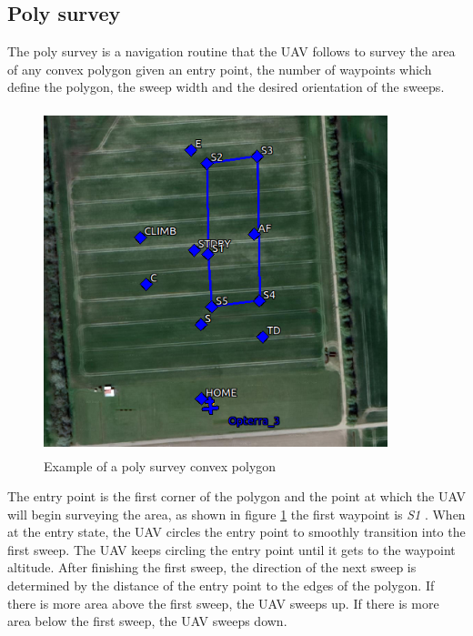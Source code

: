 \subsection{Poly survey}
The poly survey is a navigation routine that the UAV follows to survey the area of any convex polygon given an entry point, the number of waypoints which define the polygon, the sweep width and the desired orientation of the sweeps.
\begin{figure}[H]
\centering
\includegraphics[width=10cm,height=10cm,keepaspectratio]{imagenes/Convex_polygon.png}
\caption{Example of a poly survey convex polygon}
\label{fig:Convex_poly}
\end{figure}
The entry point is the first corner of the polygon and the point at which the UAV will begin surveying the area, as shown in figure \ref{fig:Convex_poly} the first waypoint is  \textit{S1} . When at the entry state, the UAV circles the entry point to smoothly transition into the first sweep. The UAV keeps circling the entry point until it gets to the waypoint altitude. After finishing the first sweep, the direction of the next sweep is determined by the distance of the entry point to the edges of the polygon. If there is more area above the first sweep, the UAV sweeps up. If there is more area below the first sweep, the UAV sweeps down.\cite{Poly_survey}

